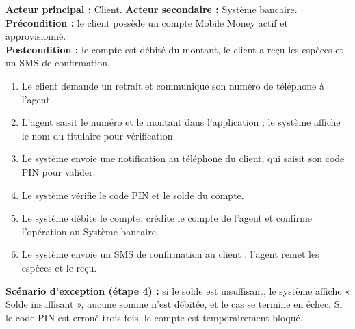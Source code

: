 \documentclass[11pt]{article}
\begin{document}
\begin{exemplebox}
\textbf{Acteur principal :} Client. \quad \textbf{Acteur secondaire :} Système bancaire.\\
\textbf{Précondition :} le client possède un compte Mobile Money actif et approvisionné.\\
\textbf{Postcondition :} le compte est débité du montant, le client a reçu les espèces et un SMS de confirmation.
\begin{enumerate}
\item Le client demande un retrait et communique son numéro de téléphone à l'agent.
\item L'agent saisit le numéro et le montant dans l'application ; le système affiche le nom du titulaire pour vérification.
\item Le système envoie une notification au téléphone du client, qui saisit son code PIN pour valider.
\item Le système vérifie le code PIN et le solde du compte.
\item Le système débite le compte, crédite le compte de l'agent et confirme l'opération au Système bancaire.
\item Le système envoie un SMS de confirmation au client ; l'agent remet les espèces et le reçu.
\end{enumerate}
\textbf{Scénario d'exception (étape 4) :} si le solde est insuffisant, le système affiche « Solde insuffisant », aucune somme n'est débitée, et le cas se termine en échec. Si le code PIN est erroné trois fois, le compte est temporairement bloqué.
\end{exemplebox}
\end{document}
